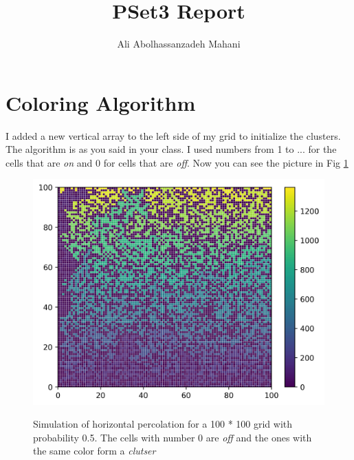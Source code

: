 \documentclass[12pt]{article}
\title{PSet3 Report}
\author{Ali Abolhassanzadeh Mahani}
\begin{document}
	\maketitle
	
	\section{Coloring Algorithm}
	I added a new vertical array to the left side of my grid to initialize the clusters. The algorithm is as you said
	in your class. I used numbers from 1 to ... for the cells that are \emph{on} and 0 for cells that are \emph{off}.
	Now you can see the picture in Fig \ref{fig:Color}
	\begin{figure}[h!]
		\centering
		\includegraphics[width=0.9\linewidth]{../p2/colored.jpg}
		\label{fig:Color}
		\caption{Simulation of horizontal percolation for a 100 * 100 grid with probability 0.5. The cells with number 0 are \emph{off} and the ones with the same color form a \emph{clutser}}
	\end{figure}
	
\end{document}
